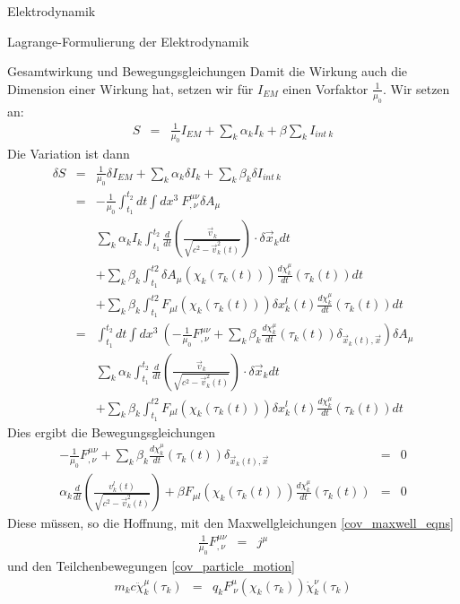 \begin{chapter}{\titlestr}
\begin{section}{Elektrodynamik}
\begin{subsection}{Lagrange-Formulierung der Elektrodynamik}
\begin{subsubsection}{Gesamtwirkung und Bewegungsgleichungen}
Damit die Wirkung auch die Dimension einer Wirkung hat, setzen wir für $I_{EM}$ einen Vorfaktor $\frac{1}{\mu_0}$.
Wir setzen an:
\begin{eqnarray*}
S &=& \frac{1}{\mu_0}I_{EM}+\sum_k \alpha_k I_k+\beta\sum_k I_{int\ k}
\end{eqnarray*}
Die Variation ist dann
\begin{eqnarray*}
\delta S &=& \frac{1}{\mu_0}\delta I_{EM}+\sum_k \alpha_k \delta I_k+\sum_k\beta_k \delta I_{int\ k}\\
&=& -\frac{1}{\mu_0}\int_{t_1}^{t_2} dt \int dx^3 \ F^{\mu\nu}_{,\nu}\delta A_\mu\\
&&\sum_k \alpha_k I_k\int_{t_1}^{t_2} \frac{d}{dt}\left(\frac{\vec{v}_k}{\sqrt{c^2-\vec{v}_k^2(t)}}\right)\cdot\delta \vec{x}_kdt\\
&&+\sum_k\beta_k \int_{t_1}^{t2} \delta A_\mu(\chi_k(\tau_k(t)))\frac{d\chi_k^\mu}{dt}(\tau_k(t))dt\\
&&+\sum_k\beta_k \int_{t_1}^{t2} F_{\mu l}(\chi_k(\tau_k(t)))\delta x_k^l(t)\frac{d\chi_k^\mu}{dt}(\tau_k(t))dt\\
&=& \int_{t_1}^{t_2} dt \int dx^3 \ \left(-\frac{1}{\mu_0}F^{\mu\nu}_{,\nu}+\sum_k\beta_k \frac{d\chi_k^\mu}{dt}(\tau_k(t))\delta_{\vec{x}_k(t),\vec{x}}\right)\delta A_\mu\\
&&\sum_k \alpha_k \int_{t_1}^{t_2} \frac{d}{dt}\left(\frac{\vec{v}_k}{\sqrt{c^2-\vec{v}_k^2(t)}}\right)\cdot\delta \vec{x}_kdt\\
&&+\sum_k\beta_k \int_{t_1}^{t2} F_{\mu l}(\chi_k(\tau_k(t)))\delta x_k^l(t)\frac{d\chi_k^\mu}{dt}(\tau_k(t))dt
\end{eqnarray*}
Dies ergibt die Bewegungsgleichungen
\begin{eqnarray*}
-\frac{1}{\mu_0}F^{\mu\nu}_{,\nu}+\sum_k\beta_k \frac{d\chi_k^\mu}{dt}(\tau_k(t))\delta_{\vec{x}_k(t),\vec{x}} &=& 0\\
\alpha_k \frac{d}{dt}\left(\frac{v^l_k(t)}{\sqrt{c^2-\vec{v}_k^2(t)}}\right)
+\beta F_{\mu l}(\chi_k(\tau_k(t)))\frac{d\chi_k^\mu}{dt}(\tau_k(t)) &=&0
\end{eqnarray*}
Diese müssen, so die Hoffnung, mit den Maxwellgleichungen \ref{cov_maxwell_eqns}
\begin{eqnarray*}
\frac{1}{\mu_0}F^{\mu\nu}_{,\nu} &=& j^\mu
\end{eqnarray*}
und den Teilchenbewegungen \ref{cov_particle_motion}
\begin{eqnarray*}
m_kc\ddot{\chi}_k^\mu(\tau_k) &=& q_kF^\mu_{\ \nu}(\chi_k(\tau_k))\dot{\chi}_k^\nu(\tau_k)

\end{eqnarray*}
\end{subsubsection}
\end{subsection}
\end{section}
\end{chapter}
